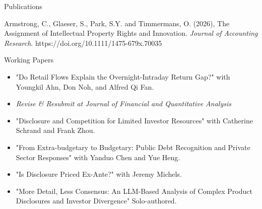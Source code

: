 \documentclass{resume} %
\newcommand{\MYhref}[3][blue]{\href{#2}{\color{#1}{#3}}}%
\begin{document}
\begin{rSection}{Publications}

Armstrong, C., Glaeser, S., Park, S.Y. and Timmermans, O. (2026), The Assignment of Intellectual Property Rights and Innovation. \textit{Journal of Accounting Research}. https://doi.org/10.1111/1475-679x.70035

\begin{rSection}{Working Papers}

\begin{itemize}
  \item {"Do Retail Flows Explain the Overnight-Intraday Return Gap?" with Youngkil Ahn, Don Noh, and Alfred Qi Fan.}
  \item[] \emph{Revise \& Resubmit at Journal of Financial and Quantitative Analysis}
\end{itemize}
\vspace{0.2cm}

\begin{itemize}
    \item {"Disclosure and Competition for Limited Investor Resources" with Catherine Schrand and Frank Zhou.}
\end{itemize}
\vspace{0.2cm}

\begin{itemize}
  \item {"From Extra-budgetary to Budgetary: Public Debt Recognition and Private Sector Responses" with Yanduo Chen and Yue Heng.} 
\end{itemize}
\end{rSection}
\vspace{0.2cm}

\begin{itemize}
  \item {"Is Disclosure Priced Ex-Ante?" with Jeremy Michels.} 
\end{itemize}
\vspace{0.2cm}

\begin{itemize}
  \item {"More Detail, Less Consensus: An LLM-Based Analysis of Complex Product Disclosures and Investor Divergence" Solo-authored.}
\end{itemize}
\vspace{0.2cm}



\end{rSection}
\end{document}
